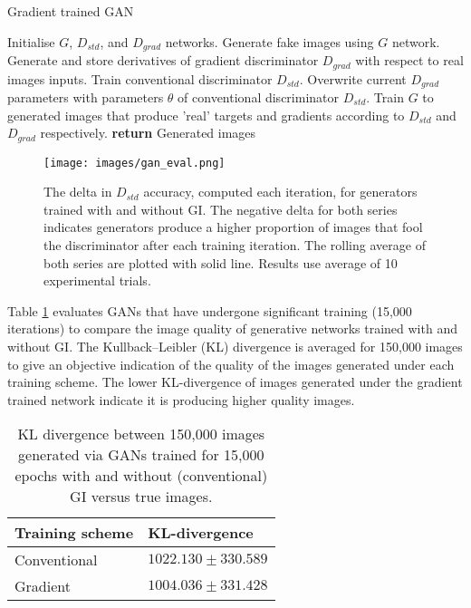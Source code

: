\documentclass{article}
\begin{document}
\begin{algorithm}[!ht]
\caption{Gradient trained GAN}
\label{alg:gan_grad}
\begin{algorithmic}[1] %
\STATE Initialise $G$, $D_{std}$, and $D_{grad}$ networks.
\STATE Generate fake images using $G$ network.
\STATE Generate and store derivatives of gradient discriminator $D_{grad}$ with respect to real images inputs.
\STATE Train conventional discriminator $D_{std}$.
\STATE Overwrite current $D_{grad}$ parameters with parameters $\theta$ of conventional discriminator $D_{std}$.
\STATE Train $G$ to generated images that produce 'real' targets and gradients according to $D_{std}$ and $D_{grad}$ respectively.
\ENDFOR
\STATE \textbf{return} Generated images
\end{algorithmic}
\end{algorithm}

\begin{figure}[!ht]
\texttt{[image: images/gan\_eval.png]}
\caption{The delta in $D_{std}$ accuracy, computed each iteration, for generators trained with and without GI. The negative delta for both series indicates generators produce a higher proportion of images that fool the discriminator after each training iteration. The rolling average of both series are plotted with solid line. Results use average of 10 experimental trials.}
\label{gan_eval}
\end{figure}

Table \ref{tab:GAN_res} evaluates GANs that have undergone significant training (15,000 iterations) to compare the image quality of generative networks trained with and without GI. The Kullback–Leibler (KL) divergence is averaged for 150,000 images to give an objective indication of the quality of the images generated under each training scheme. The lower KL-divergence of images generated under the gradient trained network indicate it is producing higher quality images. 

\begin{table}[!ht]
\centering
\begin{tabular}{ll}
\toprule
\textbf{Training scheme}  & \textbf{KL-divergence}  \\
\bottomrule
Conventional       & $1022.130  \pm 330.589$       \\
Gradient       & $1004.036  \pm 331.428$      \\
\bottomrule
\end{tabular}
\caption{KL divergence between 150,000 images generated via GANs trained for 15,000 epochs with and without (conventional) GI versus true images.}
\label{tab:GAN_res}
\end{table}
\end{document}
